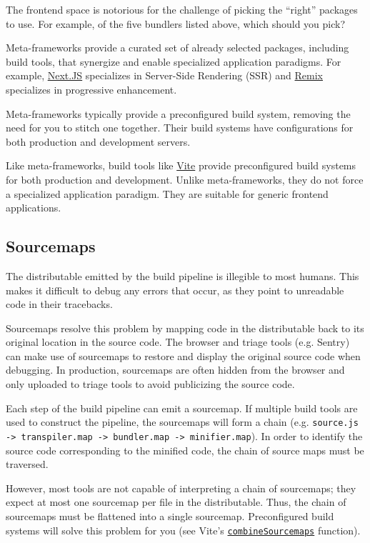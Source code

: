 \documentclass{article}
\begin{document}
The frontend space is notorious for the challenge of picking the ``right'' packages to use. For
example, of the five bundlers listed above, which should you pick?

Meta-frameworks provide a curated set of already selected packages, including build tools, that
synergize and enable specialized application paradigms. For example,
\href{https://nextjs.org}{Next.JS} specializes in Server-Side Rendering (SSR) and
\href{https://remix.run}{Remix} specializes in progressive enhancement.

Meta-frameworks typically provide a preconfigured build system, removing the need for you to stitch
one together. Their build systems have configurations for both production and development servers.

Like meta-frameworks, build tools like \href{https://vitejs.dev/}{Vite} provide preconfigured build
systems for both production and development. Unlike meta-frameworks, they do not force a specialized
application paradigm. They are suitable for generic frontend applications.

\subsection{Sourcemaps}

The distributable emitted by the build pipeline is illegible to most humans. This makes it difficult
to debug any errors that occur, as they point to unreadable code in their tracebacks.

Sourcemaps resolve this problem by mapping code in the distributable back to its original location
in the source code. The browser and triage tools (e.g. Sentry) can make use of sourcemaps to restore
and display the original source code when debugging. In production, sourcemaps are often hidden from
the browser and only uploaded to triage tools to avoid publicizing the source code.

Each step of the build pipeline can emit a sourcemap. If multiple build tools are used to construct
the pipeline, the sourcemaps will form a chain (e.g. \texttt{source.js -> transpiler.map ->
bundler.map -> minifier.map}). In order to identify the source code corresponding to the minified
code, the chain of source maps must be traversed.

However, most tools are not capable of interpreting a chain of sourcemaps; they expect at most one
sourcemap per file in the distributable. Thus, the chain of sourcemaps must be flattened into a
single sourcemap. Preconfigured build systems will solve this problem for you (see Vite's
\href{https://github.com/vitejs/vite/blob/feae09fdfab505e58950c915fe5d8dd103d5ffb9/packages/vite/src/node/utils.ts\#L831}{\texttt{combineSourcemaps}}
function).
\end{document}

